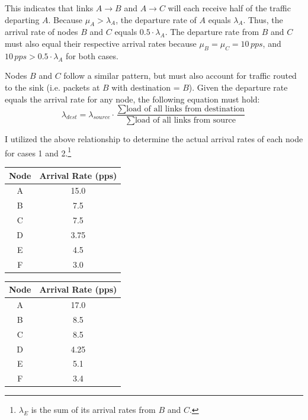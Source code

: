 \documentclass{article}
\begin{document}
This indicates that links $A \rightarrow B$ and $A \rightarrow C$ will each receive half of the traffic departing $A$.
Because $\mu_A > \lambda_A$, the departure rate of $A$ equals $\lambda_A$.
Thus, the arrival rate of nodes $B$ and $C$ equals $0.5 \cdot \lambda_A$.
The departure rate from $B$ and $C$ must also equal their respective arrival rates because $\mu_B = \mu_C = 10 \, pps$, and $10 \, pps > 0.5 \cdot \lambda_A$ for both cases.

Nodes $B$ and $C$ follow a similar pattern, but must also account for traffic routed to the sink (i.e. packets at $B$ with destination = $B$).
Given the departure rate equals the arrival rate for any node, the following equation must hold:
\begin{equation}
\lambda_{dest} = \lambda_{source} \cdot \frac{\sum \text{load of all links from destination}}{\sum \text{load of all links from source}}
\label{eq:arrivalRates}
\end{equation}

I utilized the above relationship to determine the actual arrival rates of each node for cases 1 and 2.\footnote{$\lambda_E$ is the sum of its arrival rates from $B$ and $C$.}
\newline

\begin{minipage}{0.5\textwidth}
\centering
\begin{tabular}{|c|c|} \hline
\textbf{Node} & \textbf{Arrival Rate (pps)} \\ \hline
A & 15.0 \\ \hline
B & 7.5 \\ \hline
C & 7.5 \\ \hline
D & 3.75 \\ \hline
E & 4.5 \\ \hline
F & 3.0 \\ \hline
\end{tabular}
\label{tab:expArrival_case1}
\end{minipage}
\begin{minipage}{0.5\textwidth}
\centering
\begin{tabular}{|c|c|} \hline
\textbf{Node} & \textbf{Arrival Rate (pps)} \\ \hline
A & 17.0 \\ \hline
B & 8.5 \\ \hline
C & 8.5 \\ \hline
D & 4.25 \\ \hline
E & 5.1 \\ \hline
F & 3.4 \\ \hline
\end{tabular}
\label{tab:expArrival_case2}
\end{minipage}
\newline
\end{document}
